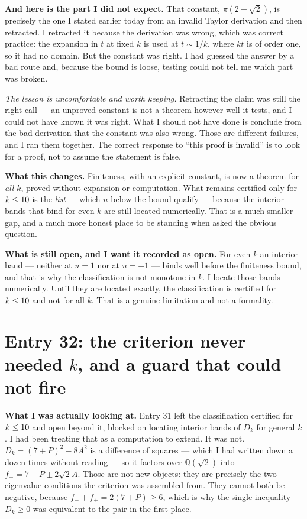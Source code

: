 \documentclass[12pt]{article}
\begin{document}
\textbf{And here is the part I did not expect.} That constant, $\pi(2+\sqrt2)$,
is precisely the one I stated earlier today from an invalid Taylor derivation
and then retracted. I retracted it because the derivation was wrong, which was
correct practice: the expansion in $t$ at fixed $k$ is used at $t\sim1/k$, where
$kt$ is of order one, so it had no domain. But the constant was right. I had
guessed the answer by a bad route and, because the bound is loose, testing
could not tell me which part was broken.

\emph{The lesson is uncomfortable and worth keeping.} Retracting the claim was
still the right call --- an unproved constant is not a theorem however well it
tests, and I could not have known it was right. What I should not have done is
conclude from the bad derivation that the constant was also wrong. Those are
different failures, and I ran them together. The correct response to ``this
proof is invalid'' is to look for a proof, not to assume the statement is false.

\textbf{What this changes.} Finiteness, with an explicit constant, is now a
theorem for \emph{all} $k$, proved without expansion or computation. What
remains certified only for $k\le10$ is the \emph{list} --- which $n$ below
the bound qualify --- because the interior bands that bind for even $k$ are
still located numerically. That is a much smaller gap, and a much more honest
place to be standing when asked the obvious question.

\textbf{What is still open, and I want it recorded as open.} For even $k$ an
interior band --- neither at $u=1$ nor at $u=-1$ --- binds well before the
finiteness bound, and that is why the classification is not monotone in $k$.
I locate those bands numerically. Until they are located exactly, the
classification is certified for $k\le10$ and not for all $k$. That is a
genuine limitation and not a formality.

\section*{Entry 32: the criterion never needed $k$, and a guard that could not fire}

\textbf{What I was actually looking at.} Entry 31 left the classification
certified for $k\le10$ and open beyond it, blocked on locating interior
bands of $D_k$ for general $k$. I had been treating that as a computation to
extend. It was not. $D_k=(7+P)^{2}-8A^{2}$ is a difference of squares --- which
I had written down a dozen times without reading --- so it factors over
$\mathbb Q(\sqrt2)$ into $f_\pm=7+P\pm2\sqrt2A$. Those are not new objects:
they are precisely the two eigenvalue conditions the criterion was assembled
from. They cannot both be negative, because $f_-+f_+=2(7+P)\ge6$, which is why
the single inequality $D_k\ge0$ was equivalent to the pair in the first place.
\end{document}
